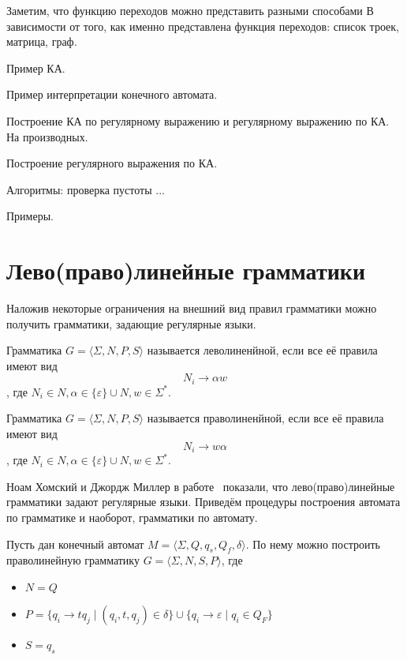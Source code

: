 Заметим, что функцию переходов можно представить разными способами В зависимости от того, как именно представлена функция переходов: список троек, матрица, граф.

\begin{example}
    Пример КА.    
    \begin{tikzpicture}
        
    \end{tikzpicture}
\end{example}



\begin{example}
Пример интерпретации конечного автомата.
\end{example}

Построение КА по регулярному выражению и регулярному выражению по КА. На производных.

Построение регулярного выражения по КА.

Алгоритмы: проверка пустоты ... 

Примеры.


\section{Лево(право)линейные грамматики}

Наложив некоторые ограничения на внешний вид правил грамматики можно получить грамматики, задающие регулярные языки.

\begin{definition}
    Грамматика $G=\langle \Sigma, N, P, S \rangle$ называется леволиненйной, если все её правила имеют вид $$N_i \to \alpha w $$, где $N_i \in N, \alpha \in \{\varepsilon\} \cup N, w \in \Sigma ^*$.
\end{definition}

\begin{definition}
    Грамматика $G=\langle \Sigma, N, P, S \rangle$ называется праволиненйной, если все её правила имеют вид $$N_i \to  w \alpha$$, где $N_i \in N, \alpha \in \{\varepsilon\} \cup N, w \in \Sigma ^*$.
\end{definition}



Ноам Хомский и Джордж Миллер в работе~\cite{chomsky1958finite} показали, что лево(право)линейные грамматики задают регулярные языки. 
Приведём процедуры построения автомата по грамматике и наоборот, грамматики по автомату.

Пусть дан конечный автомат $M = \langle \Sigma, Q, q_s, Q_f, \delta \rangle$. По нему можно построить праволинейную грамматику $G=\langle \Sigma, N, S, P \rangle$, где
\begin{itemize}
    \item $N = Q$
    \item $P = \{ q_i \to t q_j \mid (q_i, t, q_j)\in \delta\} \cup \{ q_i \to \varepsilon \mid q_i \in Q_F\}$
    \item $S = q_s$
\end{itemize}

